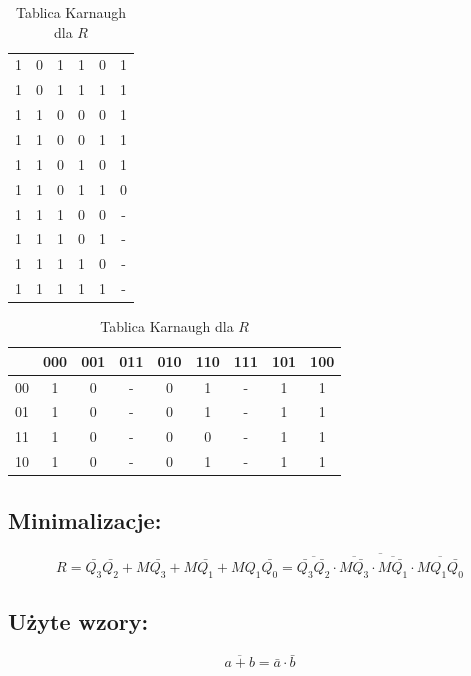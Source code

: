 \documentclass[12pt,a4paper]{article}
\begin{document}
\begin{table}[H]
\begin{minipage}{.5\textwidth}
\begin{tabular}{ccccc|c}
						1	&	0	&	1	&	1	&	0	&	1	\\
						1	&	0	&	1	&	1	&	1	&	1	\\\hline
						1	&	1	&	0	&	0	&	0	&	1	\\
						1	&	1	&	0	&	0	&	1	&	1	\\
						1	&	1	&	0	&	1	&	0	&	1	\\
						1	&	1	&	0	&	1	&	1	&	0	\\\hline
						1	&	1	&	1	&	0	&	0	&	-	\\
						1	&	1	&	1	&	0	&	1	&	-	\\
						1	&	1	&	1	&	1	&	0	&	-	\\
						1	&	1	&	1	&	1	&	1	&	-	\\
					\end{tabular}
				\end{minipage}
			
				\caption{Tablica Karnaugh dla $R$}
				\vspace{0.2cm}
				\centering
				\begin{tabular}{c|c|c|c|c|c|c|c|c}
					\backslashbox{$Q_2$}{$Q_1Q_0$}&000&001&011&010&110&111&101&100\\\hline
					00	&	1	&	0	&	-	&	0	&	1	&	-	&	1	&	1	\\\hline
					01	&	1	&	0	&	-	&	0	&	1	&	-	&	1	&	1	\\\hline
					11	&	1	&	0	&	-	&	0	&	0	&	-	&	1	&	1	\\\hline
					10	&	1	&	0	&	-	&	0	&	1	&	-	&	1	&	1	
					
				\end{tabular} 
			\end{table}
		\subsection{Minimalizacje:}
			
			\begin{displaymath}
			R = \bar{Q_3}\bar{Q_2} + M\bar{Q_3} + M\bar{Q_1} + MQ_1\bar{Q_0} = \overline{\overline{\bar{Q_3}\bar{Q_2}} \cdot \overline{M\bar{Q_3}} \cdot \overline{M\bar{Q_1}} \cdot \overline{MQ_1\bar{Q_0}}}
			\end{displaymath}
			
		\subsection{Użyte wzory:}
		
			\begin{equation}
			\overline{a+b}=\bar{a}\cdot\bar{b}
			\end{equation}
			
\end{document}
